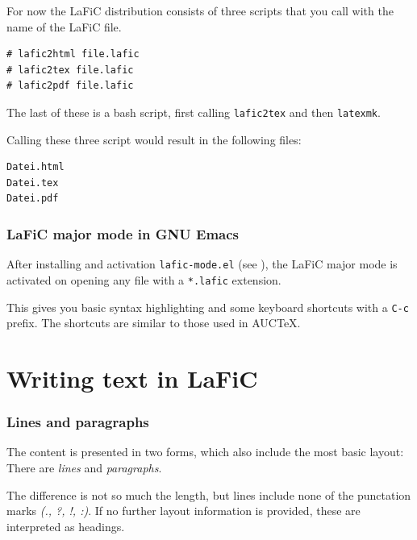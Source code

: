 \documentclass{article}
\begin{document}
{For now the LaFiC distribution consists of three scripts
that you call with the name of the LaFiC file.\\}

\begin{verbatim}
# lafic2html file.lafic
# lafic2tex file.lafic
# lafic2pdf file.lafic
\end{verbatim}


{The last of these is a bash script, first calling \texttt{lafic2tex}
and then \texttt{latexmk}.\\}

{Calling these three script would result in the following
files:\\}

\begin{verbatim}
Datei.html
Datei.tex
Datei.pdf
\end{verbatim}


\section{LaFiC major mode in GNU Emacs}

{After installing and activation \texttt{lafic-mode.el} (see
\xspace ), the LaFiC major mode is activated on opening
any file with a \texttt{*.lafic} extension.\\}

{This gives you basic syntax highlighting and some keyboard
shortcuts with a \texttt{C-c} prefix. The shortcuts are similar to
those used in AUCTeX.\\}

\part{Writing text in LaFiC}
\label{Writing}

\section{Lines and paragraphs}

{The content is presented in two forms, which also include
the most basic layout: There are \emph{lines} and \emph{paragraphs}.\\}

{The difference is not so much the length, but lines include
none of the punctation marks \emph{(., ?, !, :)}. If no
further layout information is provided, these are
interpreted as headings.\\}
\end{document}
